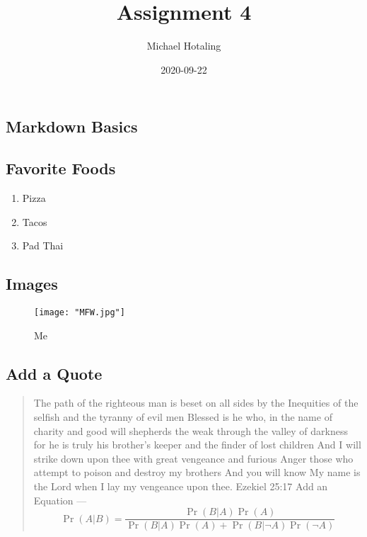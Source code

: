 \documentclass[
]{article}
\title{Assignment 4}
\author{Michael Hotaling}
\date{2020-09-22}
\providecommand{\tightlist}{%
  \setlength{\itemsep}{0pt}\setlength{\parskip}{0pt}}
\begin{document}
\maketitle

\hypertarget{markdown-basics}{%
\subsection{Markdown Basics}\label{markdown-basics}}

\hypertarget{favorite-foods}{%
\subsection{Favorite Foods}\label{favorite-foods}}

\begin{enumerate}
\def\labelenumi{\arabic{enumi}.}
\tightlist
\item
  Pizza
\item
  Tacos
\item
  Pad Thai
\end{enumerate}

\hypertarget{images}{%
\subsection{Images}\label{images}}

\begin{figure}
\centering
\texttt{[image: "MFW.jpg"]}
\caption{Me}
\end{figure}

\hypertarget{add-a-quote}{%
\subsection{Add a Quote}\label{add-a-quote}}

\begin{quote}
The path of the righteous man is beset on all sides by the Inequities of
the selfish and the tyranny of evil men Blessed is he who, in the name
of charity and good will shepherds the weak through the valley of
darkness for he is truly his brother's keeper and the finder of lost
children And I will strike down upon thee with great vengeance and
furious Anger those who attempt to poison and destroy my brothers And
you will know My name is the Lord when I lay my vengeance upon thee.
Ezekiel 25:17 Add an Equation --- \begin{equation}
\Pr(A|B)=\frac{\Pr(B|A)\Pr(A)}{\Pr(B|A)\Pr(A)+\Pr(B|\neg A)\Pr(\neg A)}
\end{equation}
\end{quote}
\end{document}
